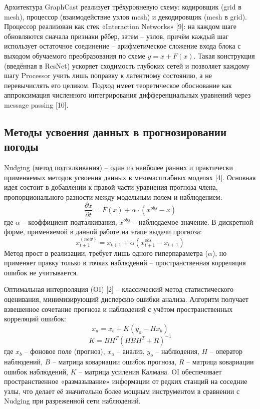 \documentclass[14pt,a4paper]{extarticle}
\numberwithin{table}{section}
\numberwithin{figure}{section}
\numberwithin{equation}{section}
\begin{document}
Архитектура GraphCast реализует трёхуровневую схему: кодировщик
(grid в mesh), процессор (взаимодействие узлов mesh) и
декодировщик (mesh в grid). Процессор реализован как стек «Interaction Networks»
{[}9{]}: на каждом шаге обновляются сначала признаки рёбер, затем --
узлов, причём каждый шаг использует остаточное соединение
-- арифметическое сложение входа блока с выходом обучаемого
преобразования по схеме \(y = x + F(x)\). Такая конструкция (введённая
в ResNet) ускоряет сходимость глубоких сетей и позволяет каждому шагу
Processor учить лишь поправку к латентному состоянию, а не
перевычислять его целиком. Подход имеет теоретическое обоснование как
аппроксимация численного интегрирования дифференциальных уравнений
через message passing {[}10{]}.

\subsection{Методы усвоения данных в прогнозировании погоды}\label{ux43cux435ux442ux43eux434ux44b-ux443ux441ux432ux43eux435ux43dux438ux44f-ux434ux430ux43dux43dux44bux445-ux432-ux43fux440ux43eux433ux43dux43eux437ux438ux440ux43eux432ux430ux43dux438ux438-ux43fux43eux433ux43eux434ux44b}

Nudging (метод подталкивания) -- один из наиболее ранних и
практически применяемых методов усвоения данных в мезомасштабных моделях
{[}4{]}. Основная идея состоит в добавлении к правой части уравнения
прогноза члена, пропорционального разности между модельным полем и
наблюдением:
\[\frac{\partial x}{\partial t} = F(x) + \alpha \cdot (x^{obs} - x)\]
где \(\alpha\) -- коэффициент подталкивания, \(x^{obs}\) --
наблюдаемое значение. В дискретной форме, применяемой в данной работе на
этапе выдачи прогноза:
\[x_{t+1}^{(new)} = x_{t+1} + \alpha (x_{t+1}^{obs} - x_{t+1})\] Метод
прост в реализации, требует лишь одного гиперпараметра (\(\alpha\)), но
применяет правку только в точках наблюдений -- пространственная
корреляция ошибок не учитывается.

Оптимальная интерполяция (OI) {[}2{]} -- классический метод
статистического оценивания, минимизирующий дисперсию ошибки анализа.
Алгоритм получает взвешенное сочетание прогноза и наблюдений с учётом
пространственных корреляций ошибок: \[x_a = x_b + K(y_o - Hx_b)\]
\[K = BH^T(HBH^T + R)^{-1}\] где \(x_b\) -- фоновое поле (прогноз),
\(x_a\) -- анализ, \(y_o\) -- наблюдения, \(H\) -- оператор
наблюдений, \(B\) -- матрица ковариации ошибок прогноза, \(R\) --
матрица ковариации ошибок наблюдений, \(K\) -- матрица усиления
Калмана. OI обеспечивает пространственное «размазывание» информации от
редких станций на соседние узлы, что делает её значительно более мощным
инструментом в сравнении с Nudging при разреженной сети наблюдений.
\end{document}
